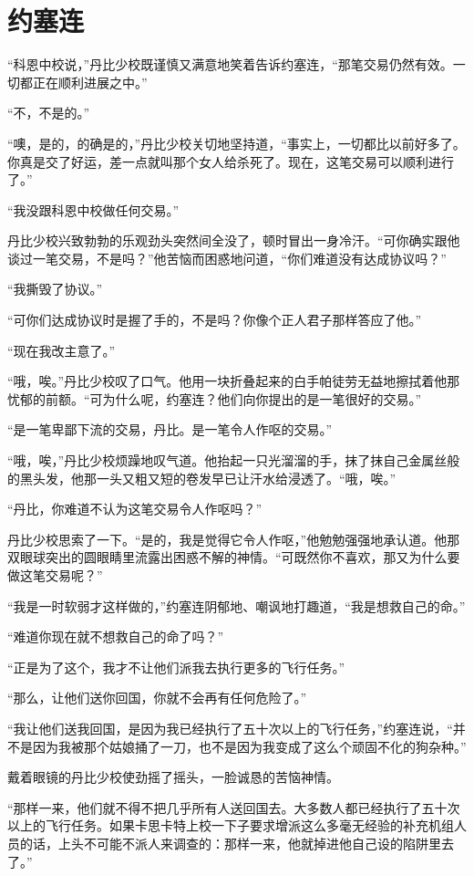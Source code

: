 \chapter{约塞连}
 
    “科恩中校说，”丹比少校既谨慎又满意地笑着告诉约塞连，“那笔交易仍然有效。一切都正在顺利进展之中。”

    “不，不是的。”

    “噢，是的，的确是的，”丹比少校关切地坚持道，“事实上，一切都比以前好多了。你真是交了好运，差一点就叫那个女人给杀死了。现在，这笔交易可以顺利进行了。”

    “我没跟科恩中校做任何交易。”

    丹比少校兴致勃勃的乐观劲头突然间全没了，顿时冒出一身冷汗。“可你确实跟他谈过一笔交易，不是吗？”他苦恼而困惑地问道，“你们难道没有达成协议吗？”

    “我撕毁了协议。”

    “可你们达成协议时是握了手的，不是吗？你像个正人君子那样答应了他。”

    “现在我改主意了。”

    “哦，唉。”丹比少校叹了口气。他用一块折叠起来的白手帕徒劳无益地擦拭着他那忧郁的前额。“可为什么呢，约塞连？他们向你提出的是一笔很好的交易。”

    “是一笔卑鄙下流的交易，丹比。是一笔令人作呕的交易。”

    “哦，唉，”丹比少校烦躁地叹气道。他抬起一只光溜溜的手，抹了抹自己金属丝般的黑头发，他那一头又粗又短的卷发早已让汗水给浸透了。“哦，唉。”

    “丹比，你难道不认为这笔交易令人作呕吗？”

    丹比少校思索了一下。“是的，我是觉得它令人作呕，”他勉勉强强地承认道。他那双眼球突出的圆眼睛里流露出困惑不解的神情。“可既然你不喜欢，那又为什么要做这笔交易呢？”

    “我是一时软弱才这样做的，”约塞连阴郁地、嘲讽地打趣道，“我是想救自己的命。”

    “难道你现在就不想救自己的命了吗？”

    “正是为了这个，我才不让他们派我去执行更多的飞行任务。”

    “那么，让他们送你回国，你就不会再有任何危险了。”

    “我让他们送我回国，是因为我已经执行了五十次以上的飞行任务，”约塞连说，“并不是因为我被那个姑娘捅了一刀，也不是因为我变成了这么个顽固不化的狗杂种。”

    戴着眼镜的丹比少校使劲摇了摇头，一脸诚恳的苦恼神情。

    “那样一来，他们就不得不把几乎所有人送回国去。大多数人都已经执行了五十次以上的飞行任务。如果卡思卡特上校一下子要求增派这么多毫无经验的补充机组人员的话，上头不可能不派人来调查的：那样一来，他就掉进他自己设的陷阱里去了。”

